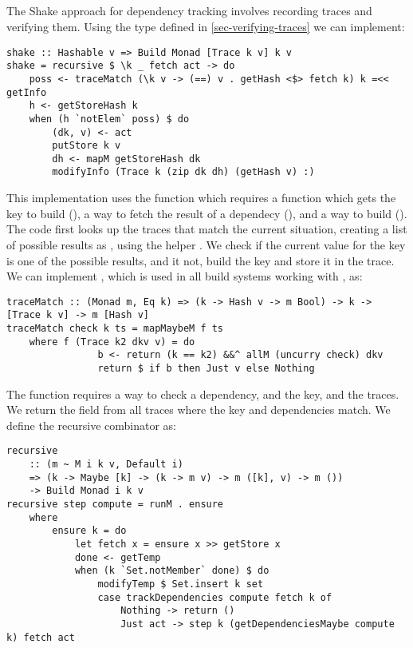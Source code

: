 \subsection{\Shake}\label{sec-implementation-shake}

The Shake approach for dependency tracking involves recording traces and verifying them. Using the  type defined in \ref{sec-verifying-traces} we can implement:

\begin{verbatim}
shake :: Hashable v => Build Monad [Trace k v] k v
shake = recursive $ \k _ fetch act -> do
    poss <- traceMatch (\k v -> (==) v . getHash <$> fetch k) k =<< getInfo
    h <- getStoreHash k
    when (h `notElem` poss) $ do
        (dk, v) <- act
        putStore k v
        dh <- mapM getStoreHash dk
        modifyInfo (Trace k (zip dk dh) (getHash v) :)
\end{verbatim}

This implementation uses the  function which requires a function which gets the key to build (), a way to fetch the result of a dependecy (), and a way to build  (). The code first looks up the traces that match the current situation, creating a list of possible results as , using the helper . We check if the current value for the key is one of the possible results, and it not, build the key and store it in the trace. We can implement , which is used in all build systems working with , as:

\begin{verbatim}
traceMatch :: (Monad m, Eq k) => (k -> Hash v -> m Bool) -> k -> [Trace k v] -> m [Hash v]
traceMatch check k ts = mapMaybeM f ts
    where f (Trace k2 dkv v) = do
                b <- return (k == k2) &&^ allM (uncurry check) dkv
                return $ if b then Just v else Nothing
\end{verbatim}

The function  requires a way to check a dependency, and the key, and the traces. We return the  field from all traces where the key and dependencies match. We define the recursive combinator as:

\begin{verbatim}
recursive
    :: (m ~ M i k v, Default i)
    => (k -> Maybe [k] -> (k -> m v) -> m ([k], v) -> m ())
    -> Build Monad i k v
recursive step compute = runM . ensure
    where
        ensure k = do
            let fetch x = ensure x >> getStore x
            done <- getTemp
            when (k `Set.notMember` done) $ do
                modifyTemp $ Set.insert k set
                case trackDependencies compute fetch k of
                    Nothing -> return ()
                    Just act -> step k (getDependenciesMaybe compute k) fetch act
\end{verbatim}

